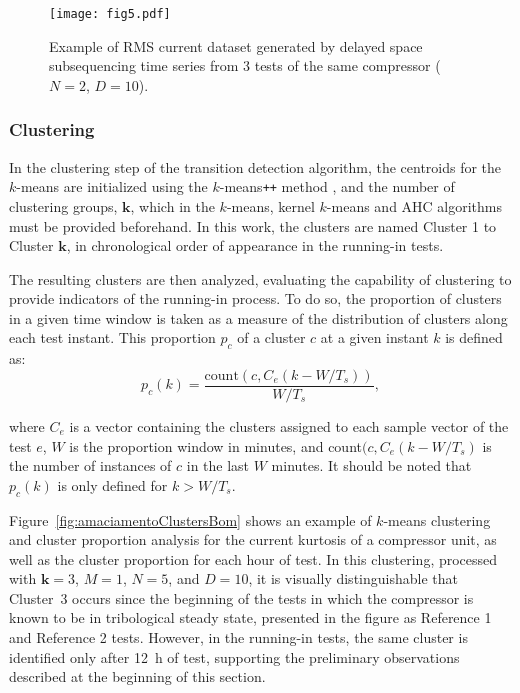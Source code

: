 \documentclass[preprint,11pt,number]{elsarticle}
\begin{document}
\begin{figure}[htb]
\begin{center}
\texttt{[image: fig5.pdf]}    %
\caption{Example of RMS current dataset generated by delayed space subsequencing time series from 3 tests of the same compressor ($N=2$, $D=10$).}
\label{fig:visualizeData3D}
\end{center}
\end{figure}

\subsubsection{Clustering}\label{subsubsec:Clustering}

In the clustering step of the transition detection algorithm, the centroids for the $k$-means are initialized using the $k$-means\texttt{++} method \cite{Arthur2007}, and the number of clustering groups, $\bm{k}$, which in the $k$-means, kernel $k$-means and AHC algorithms must be provided beforehand. In this work, the clusters are named Cluster 1 to Cluster $\bm{k}$, in chronological order of appearance in the running-in tests.

The resulting clusters are then analyzed, evaluating the capability of clustering to provide indicators of the running-in process. To do so, the proportion of clusters in a given time window is taken as a measure of the distribution of clusters along each test instant. This proportion $p_c$ of a cluster $c$ at a given instant $k$ is defined as:
\begin{equation} \label{eq:proportion}
p_c(k) = \frac{\text{count}(c,C_e(k-W/T_s))}{W/T_s},
\end{equation}

\noindent where $C_e$ is a vector containing the clusters assigned to each sample vector of the test $e$, $W$ is the proportion window in minutes, and count$(c,C_e(k-W/T_s)$ is the number of instances of $c$ in the last $W$ minutes. It should be noted that $p_c(k)$ is only defined for $k>W/T_s$.

Figure~\ref{fig:amaciamentoClustersBom} shows an example of $k$-means clustering and cluster proportion analysis for the current kurtosis of a compressor unit, as well as the cluster proportion for each hour of test. In this clustering, processed with $\bm{k} = 3$, $M = 1$, $N = 5$, and $D = 10$, it is visually distinguishable that Cluster~3 occurs since the beginning of the tests in which the compressor is known to be in tribological steady state, presented in the figure as Reference 1 and Reference 2 tests. However, in the running-in tests, the same cluster is identified only after \SI{12}{\hour} of test, supporting the preliminary observations described at the beginning of this section.
\end{document}
